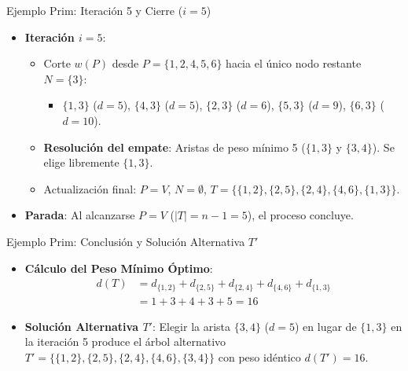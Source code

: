 \documentclass[
  ignorenonframetext,
]{beamer}
\providecommand{\tightlist}{%
  \setlength{\itemsep}{0pt}\setlength{\parskip}{0pt}}
\begin{document}
\begin{frame}{Ejemplo Prim: Iteración 5 y Cierre (\(i=5\))}
\label{ejemplo-prim-iteraciuxf3n-5-y-cierre-i5}
\begin{itemize}
\tightlist
\item
  \textbf{Iteración \(i=5\)}:

  \begin{itemize}
  \tightlist
  \item
    Corte \(w(P)\) desde \(P = \{1, 2, 4, 5, 6\}\) hacia el único nodo
    restante \(N = \{3\}\):

    \begin{itemize}
    \tightlist
    \item
      \(\{1, 3\}\) (\(d=5\)), \(\{4, 3\}\) (\(d=5\)), \(\{2, 3\}\)
      (\(d=6\)), \(\{5, 3\}\) (\(d=9\)), \(\{6, 3\}\) (\(d=10\)).
    \end{itemize}
  \item
    \textbf{Resolución del empate}: Aristas de peso mínimo 5
    (\(\{1, 3\}\) y \(\{3, 4\}\)). Se elige libremente \(\{1, 3\}\).
  \item
    Actualización final: \(P = V\), \(N = \emptyset\),
    \(T = \{\{1, 2\}, \{2, 5\}, \{2, 4\}, \{4, 6\}, \{1, 3\}\}\).
  \end{itemize}
\item
  \textbf{Parada}: Al alcanzarse \(P = V\) (\(|T| = n - 1 = 5\)), el
  proceso concluye.
\end{itemize}
\end{frame}

\begin{frame}{Ejemplo Prim: Conclusión y Solución Alternativa \(T'\)}
\label{ejemplo-prim-conclusiuxf3n-y-soluciuxf3n-alternativa-t}
\begin{itemize}
\item
  \textbf{Cálculo del Peso Mínimo Óptimo}: \[
  \begin{aligned}
  d(T) &= d_{\{1,2\}} + d_{\{2,5\}} + d_{\{2,4\}} + d_{\{4,6\}} + d_{\{1,3\}} \\
       &= 1 + 3 + 4 + 3 + 5 = 16
  \end{aligned}
  \]
\item
  \textbf{Solución Alternativa \(T'\)}: Elegir la arista \(\{3, 4\}\)
  (\(d=5\)) en lugar de \(\{1, 3\}\) en la iteración 5 produce el árbol
  alternativo
  \(T' = \{\{1, 2\}, \{2, 5\}, \{2, 4\}, \{4, 6\}, \{3, 4\}\}\) con peso
  idéntico \(d(T') = 16\).
\end{itemize}
\end{frame}
\end{document}
